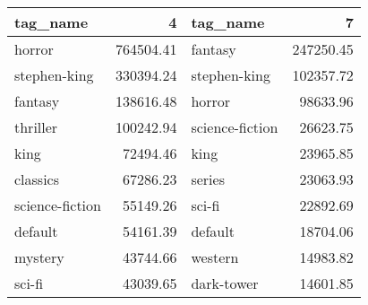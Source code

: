 \begin{tabular}{lrlr}
\toprule
        tag\_name &         4 &         tag\_name &         7 \\
\midrule
          horror & 764504.41 &          fantasy & 247250.45 \\
    stephen-king & 330394.24 &     stephen-king & 102357.72 \\
         fantasy & 138616.48 &           horror &  98633.96 \\
        thriller & 100242.94 &  science-fiction &  26623.75 \\
            king &  72494.46 &             king &  23965.85 \\
        classics &  67286.23 &           series &  23063.93 \\
 science-fiction &  55149.26 &           sci-fi &  22892.69 \\
         default &  54161.39 &          default &  18704.06 \\
         mystery &  43744.66 &          western &  14983.82 \\
          sci-fi &  43039.65 &       dark-tower &  14601.85 \\
\bottomrule
\end{tabular}
